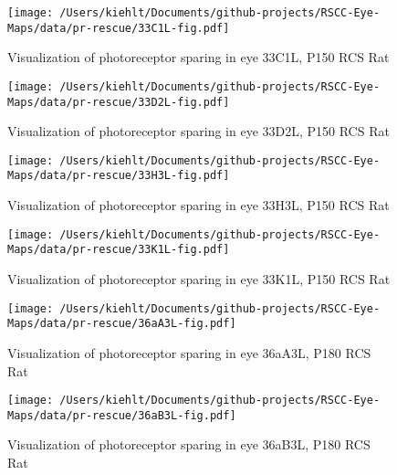 \documentclass{article}
\begin{document}
\begin{center}
\begin{figure}
\texttt{[image: /Users/kiehlt/Documents/github-projects/RSCC-Eye-Maps/data/pr-rescue/33C1L-fig.pdf]}
\caption{Visualization of photoreceptor sparing in eye 33C1L, P150 RCS Rat}
\label{fig:33C1L}
\end{figure}

\end{center}
\begin{center}
\begin{figure}
\texttt{[image: /Users/kiehlt/Documents/github-projects/RSCC-Eye-Maps/data/pr-rescue/33D2L-fig.pdf]}
\caption{Visualization of photoreceptor sparing in eye 33D2L, P150 RCS Rat}
\label{fig:33D2L}
\end{figure}

\end{center}
\begin{center}
\begin{figure}
\texttt{[image: /Users/kiehlt/Documents/github-projects/RSCC-Eye-Maps/data/pr-rescue/33H3L-fig.pdf]}
\caption{Visualization of photoreceptor sparing in eye 33H3L, P150 RCS Rat}
\label{fig:33H3L}
\end{figure}

\end{center}
\begin{center}
\begin{figure}
\texttt{[image: /Users/kiehlt/Documents/github-projects/RSCC-Eye-Maps/data/pr-rescue/33K1L-fig.pdf]}
\caption{Visualization of photoreceptor sparing in eye 33K1L, P150 RCS Rat}
\label{fig:33K1L}
\end{figure}

\end{center}
\begin{center}
\begin{figure}
\texttt{[image: /Users/kiehlt/Documents/github-projects/RSCC-Eye-Maps/data/pr-rescue/36aA3L-fig.pdf]}
\caption{Visualization of photoreceptor sparing in eye 36aA3L, P180 RCS Rat}
\label{fig:36aA3L}
\end{figure}

\end{center}
\begin{center}
\begin{figure}
\texttt{[image: /Users/kiehlt/Documents/github-projects/RSCC-Eye-Maps/data/pr-rescue/36aB3L-fig.pdf]}
\caption{Visualization of photoreceptor sparing in eye 36aB3L, P180 RCS Rat}
\label{fig:36aB3L}
\end{figure}

\end{center}
\end{document}
